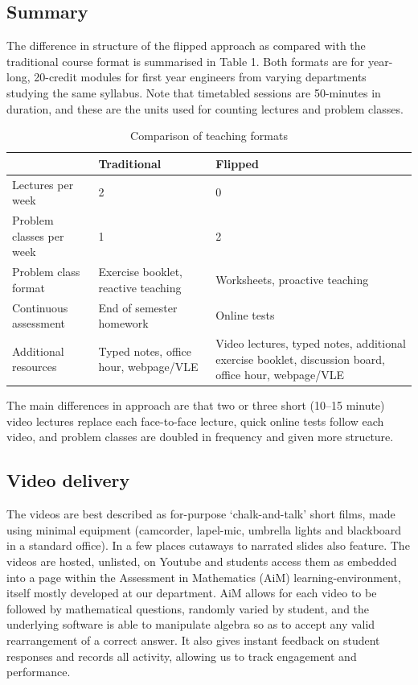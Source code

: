\documentclass{amsart}
\begin{document}
\subsection{Summary}

The difference in structure of the flipped approach as compared with the traditional course format is summarised in Table 1.  Both formats are for year-long, 20-credit modules for first year engineers from varying departments studying the same syllabus.  Note that timetabled sessions are 50-minutes in duration, and these are the units used for counting lectures and problem classes.

\begin{table}[htb]
\begin{tabularx}{0.8\textwidth}{lXX}
 & Traditional & Flipped\\\hline
Lectures per week & 2 & 0\\
Problem classes per week & 1 & 2\\
Problem class format & Exercise booklet, reactive teaching & Worksheets, proactive teaching\\
Continuous assessment & End of semester homework & Online tests\\
Additional resources & Typed notes, office hour, webpage/VLE & Video lectures, typed notes, additional exercise booklet, discussion board, office hour, webpage/VLE
\end{tabularx}
\caption{Comparison of teaching formats}
\end{table}

The main differences in approach are that two or three short (10--15 minute) video lectures replace each face-to-face lecture, quick online tests follow each video, and problem classes are doubled in frequency and given more structure.

\subsection{Video delivery}

The videos are best described as for-purpose `chalk-and-talk' short films, made using minimal equipment (camcorder, lapel-mic, umbrella lights and blackboard in a standard office).  In a few places cutaways to narrated slides also feature.  The videos are hosted, unlisted, on Youtube and students access them as embedded into a page within the Assessment in Mathematics (AiM) learning-environment, itself mostly developed at our department.  AiM allows for each video to be followed by mathematical questions, randomly varied by student, and the underlying software is able to manipulate algebra so as to accept any valid rearrangement of a correct answer. It also gives instant feedback on student responses and records all activity, allowing us to track engagement and performance.
\end{document}

